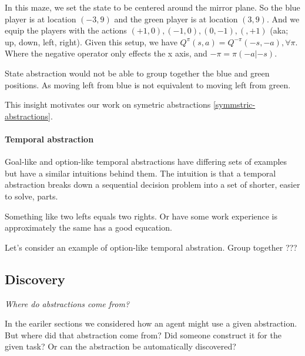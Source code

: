 In this maze, we set the state to be centered around the mirror plane.
So the blue player is at location $(-3, 9)$ and the green player is at location
$(3, 9)$. And we equip the players with the actions $(+1, 0), (-1, 0), (0, -1), (, +1)$ (aka; up, down, left, right).
Given this setup, we have $Q^{\pi}(s, a) = Q^{-\pi}(-s, -a), \forall \pi$. Where the negative
 operator only effects the x axis, and $-\pi = \pi(-a|-s)$.

State abstraction would not be able to group together the blue and green positions.
As moving left from blue is not equivalent to moving left from green.

This insight motivates our work on symetric abstractions \ref{symmstric-abstractions}.

\paragraph{Temporal abstraction}

Goal-like and option-like temporal abstractions have differing sets of examples
but have a similar intuitions behind them. The intuition is that
a temporal abstraction breaks down a sequential decision problem into a set of
shorter, easier to solve, parts.

Something like two lefts equals two rights. Or have some work experience is approximately the same has a good equcation.

Let's consider an example of option-like temporal abstration. Group together ???


\subsection{Discovery}

\begin{displayquote}
  \textit{Where do abstractions come from?}
\end{displayquote}

In the eariler sections we considered how an agent might use a given abstraction.
But where did that abstraction come from? Did someone construct it for the given task?
Or can the abstraction be automatically discovered?





